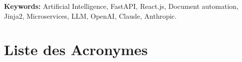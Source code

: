 \documentclass[12pt, a4paper]{report}
\begin{document}
\vspace{1cm}
\textbf{Keywords:} Artificial Intelligence, FastAPI, React.js, Document automation, Jinja2, Microservices, LLM, OpenAI, Claude, Anthropic.

\tableofcontents
\listoffigures
\listoftables

\chapter*{Liste des Acronymes}
\end{document}
